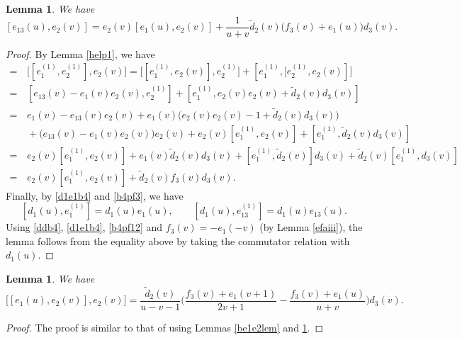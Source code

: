 \documentclass[11pt,reqno]{amsart}
\numberwithin{equation}{section}
\newtheorem{lem}[thm]{Lemma}
\theoremstyle{definition}
\theoremstyle{remark}
\newcommand{\beq}{\begin{equation}}
\newcommand{\eeq}{\end{equation}}
\newcommand{\tl}{\tilde}
\begin{document}
\begin{lem}\label{be13e2lem}
We have
\[
[e_{13}(u),e_2(v)]=e_2(v)[e_1(u),e_2(v)]+\frac{1}{u+v}\tl d_2(v)\big(f_3(v)+e_1(u)\big)d_3(v).
\]
\end{lem}
\begin{proof}
By Lemma \ref{help1}, we have
\begin{align*}
[e_{13}^{(1)},e_2(v)]=&\,\big[[e_1^{(1)},e_2^{(1)}],e_2(v)\big]=\big[[e_1^{(1)},e_2(v)],e_2^{(1)}\big]+[e_1^{(1)},\big[e_2^{(1)},e_2(v)]\big]\\
=&\,[e_{13}(v)-e_1(v)e_2(v),e_2^{(1)}]+[e_1^{(1)},e_2(v)e_2(v)+\tl d_2(v)d_3(v)]\\
=&\, e_1(v)-e_{13}(v)e_2(v)+e_1(v)\big(e_2(v)e_2(v)-1+\tl d_2(v)d_3(v)\big)\\
&\, +\big(e_{13}(v)-e_1(v)e_2(v)\big)e_2(v)+e_2(v)[e_1^{(1)},e_2(v)]+[e_1^{(1)},\tl d_2(v)d_3(v)]\\
=&\, e_2(v)[e_1^{(1)},e_2(v)]+ e_1(v) \tl d_2(v)d_3(v)+[e_1^{(1)},\tl d_2(v)]d_3(v)+\tl d_2(v)[e_1^{(1)},d_3(v)]\\
=&\, e_2(v)[e_1^{(1)},e_2(v)] + \tl d_2(v)f_3(v)d_3(v).
\end{align*}
Finally, by \eqref{d1e1b4} and \eqref{b4pf3}, we have
\beq\label{b4pf12}
[d_1(u),e_1^{(1)}]=d_1(u)e_1(u),\qquad [d_1(u),e_{13}^{(1)}]=d_1(u)e_{13}(u).
\eeq
Using \eqref{ddb4}, \eqref{d1e1b4}, \eqref{b4pf12} and $f_3(v)=-e_1(-v)$ (by Lemma \ref{efaiii}), the lemma follows from the equality above by taking the commutator relation with $d_1(u)$.
\end{proof}

\begin{lem}\label{be1e2e2lem}
We have
\[
\big[[e_1(u),e_2(v)],e_2(v)\big]=\frac{\tl d_2(v)}{u-v-1}\Big(\frac{f_3(v)+e_1(v+1)}{2v+1}-\frac{f_3(v)+e_1(u)}{u+v}\Big)d_3(v).
\]
\end{lem}
\begin{proof}
The proof is similar to that of \cite[Lemma 4.8]{KLWZ23a} using Lemmas \ref{be1e2lem} and \ref{be13e2lem}.
\end{proof}
\end{document}
